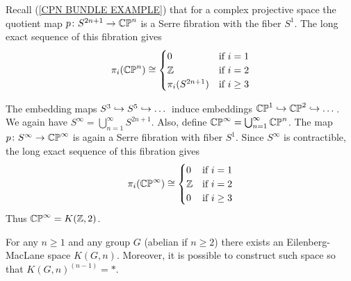 \begin{example}
Recall (\ref{CPN BUNDLE EXAMPLE}) that for a complex projective space the quotient 
map $p\colon S^{2n+1} \to {\mathbb C\mathbb P}^{n}$ is a Serre fibration with the fiber $S^{1}$. The long 
exact sequence of this fibration gives 
\[
\pi_{i}({\mathbb C\mathbb P}^{n})
\cong
\begin{cases}
0 & \text{if } i = 1\\
{\mathbb Z} & \text{if } i = 2\\
\pi_{i}(S^{2n+1}) & \text{if } i \geq 3 \\
\end{cases}
\]
\end{example}
The embedding maps $S^{3} \hookrightarrow S^{5} \hookrightarrow \dots$ induce embeddings
${\mathbb C\mathbb P}^{1}\hookrightarrow {\mathbb C\mathbb P}^{2} \hookrightarrow \dots$. We again have $S^{\infty} = \bigcup_{n=1}^{\infty}S^{2n+1}$. 
Also, define ${\mathbb C\mathbb P}^{\infty} = \bigcup_{n=1}^{\infty}{\mathbb C\mathbb P}^{n}$. The map 
$p\colon S^{\infty} \to {\mathbb C\mathbb P}^{\infty}$ is again a Serre fibration with fiber $S^{1}$. 
Since $S^{\infty}$ is contractible, the long exact sequence of this fibration gives
\[
\pi_{i}({\mathbb C\mathbb P}^{\infty})
\cong
\begin{cases}
0 & \text{if } i = 1\\
{\mathbb Z} & \text{if } i = 2\\
0 &  \text{if } i\geq 3 \\
\end{cases}
\]
Thus ${\mathbb C\mathbb P}^{\infty} = K({\mathbb Z}, 2)$.



\begin{proposition}
\label{EM SPACES EXIST PROP}
For any $n\geq 1$ and any group $G$ (abelian if $n\geq 2$) there exists 
an Eilenberg-MacLane space $K(G, n)$. Moreover, it is possible to construct 
such space so that $K(G, n)^{(n-1)} = \ast$. 
\end{proposition}





